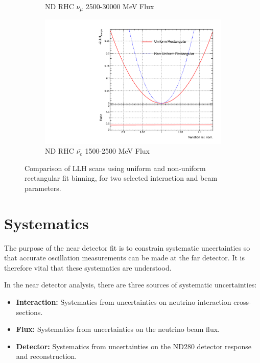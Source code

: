 \begin{figure}[h]
\begin{subfigure}{.49\textwidth}
  \caption{ND RHC $\nu_{\mu}$ 2500-30000 MeV Flux}
  \label{fig:b_30_sampolyLLH}
\end{subfigure}
\begin{subfigure}{.49\textwidth}
  \centering
  \includegraphics[width=0.95\linewidth]{figs/b_40_sampolyLLH}
  \caption{ND RHC $\bar{\nu_{e}}$ 1500-2500 MeV Flux}
  \label{fig:b_40_sampolyLLH}
\end{subfigure}
\caption{Comparison of LLH scans using uniform and non-uniform rectangular fit binning, for two selected interaction and beam parameters.}
\label{fig:polyllhscans}
\end{figure}


\section{Systematics}\label{sec:syst}

The purpose of the near detector fit is to constrain systematic uncertainties so that accurate oscillation measurements can be made at the far detector. It is therefore vital that these systematics are understood. 

In the near detector analysis, there are three sources of systematic uncertainties: 

\begin{itemize}

\item \textbf{Interaction: } Systematics from uncertainties on neutrino interaction cross-sections.

\item \textbf{Flux: } Systematics from uncertainties on the neutrino beam flux.

\item \textbf{Detector: } Systematics from uncertainties on the ND280 detector response and reconstruction.

\end{itemize}

